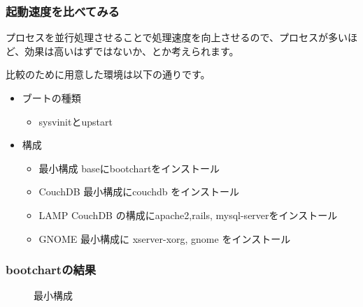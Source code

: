 \documentclass[mingoth,a4paper]{jsarticle}
\begin{document}
\subsubsection{起動速度を比べてみる}
プロセスを並行処理させることで処理速度を向上させるので、プロセスが多いほ
ど、効果は高いはずではないか、とか考えられます。

比較のために用意した環境は以下の通りです。

\begin{itemize}
\item ブートの種類
\begin{itemize}
\item sysvinitとupstart
\end{itemize}
\item 構成
\begin{itemize}
\item 最小構成 baseにbootchartをインストール
\item CouchDB 最小構成にcouchdb をインストール
\item LAMP CouchDB の構成にapache2,rails, mysql-serverをインストール
\item GNOME 最小構成に xserver-xorg, gnome をインストール 
\end{itemize}
\end{itemize}

\newpage

\subsubsection{bootchartの結果}
\begin{figure}[thbp]
\caption{最小構成}
\end{figure}
\end{document}
